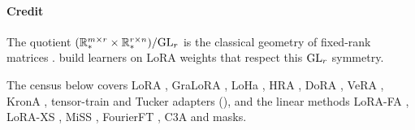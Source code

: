 \paragraph{Credit}
The quotient $(\mathbb{R}^{m\times r}_*\times\mathbb{R}^{r\times n}_*)/\mathrm{GL}_r$ is the classical geometry of fixed-rank matrices
\citep{mishra2012fixed}. \citet{putterman2024learning} build learners on LoRA weights that respect this $\mathrm{GL}_r$ symmetry.

The census below covers LoRA \citep{hu2021lora}, GraLoRA \citep{jung2025gralora}, LoHa \citep{hyeonwoo2021fedpara}, HRA
\citep{yuan2024bridging}, DoRA \citep{liu2024dora}, VeRA \citep{kopiczko2023vera}, KronA \citep{edalati2022krona},
tensor-train and Tucker adapters (), and the linear methods LoRA-FA \citep{zhang2023lora}, LoRA-XS
\citep{baazy2024lora}, MiSS \citep{kang2024miss}, FourierFT \citep{gao2024parameter}, C3A \citep{chen2024parameter} and
masks.

